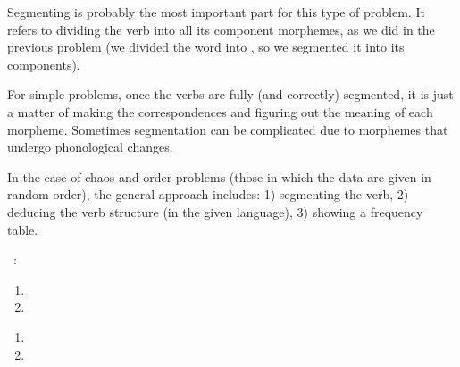 \begin{refsection}
\begin{mysolution}
 Segmenting is probably the most important part for this type of problem. It refers to dividing the verb into all its component morphemes, as we did in the previous problem (we divided the word  into , so we segmented it into its components).

For simple problems, once the verbs are fully (and correctly) segmented, it is just a matter of making the correspondences and figuring out the meaning of each morpheme. Sometimes segmentation can be complicated due to morphemes that undergo phonological changes.

In the case of chaos-and-order problems (those in which the data are given in random order), the general approach includes: 1) segmenting the verb, 2) deducing the verb structure (in the given language), 3) showing a frequency table.

\end{mysolution}
\begin{problem}{\langnameDabida}{\nameKGilyarova}{}
\IntroVerbs{\langnameDabida}\ \IntroAndEnglishRandom:

\begin{exe}
\end{exe}

\begin{assgts}
\item \detcorr
\item \transinen
\begin{enumerate}
    \item {}
    \item {}
\end{enumerate}
\item \transinen[\langnameDabida]
\begin{enumerate}[start = 3]
    \item {}
    \item {}
\end{enumerate}
\end{assgts}
\end{problem}


\end{refsection}
